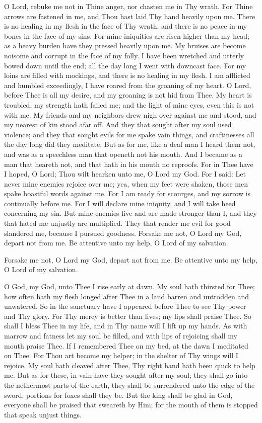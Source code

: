 \documentclass[
  14pt,
  letterpaper,
  openright,
  twocolumn,
  twoside]{memoir}
\begin{document}
O Lord, rebuke me not in Thine anger, nor chasten me in Thy wrath. For Thine arrows are fastened in me, and Thou hast laid Thy hand heavily upon me. There is no healing in my flesh in the face of Thy wrath; and there is no peace in my bones in the face of my sins. For mine iniquities are risen higher than my head; as a heavy burden have they pressed heavily upon me. My bruises are become noisome and corrupt in the face of my folly. I have been wretched and utterly bowed down until the end; all the day long I went with downcast face. For my loins are filled with mockings, and there is no healing in my flesh. I am afflicted and humbled exceedingly, I have roared from the groaning of my heart. O Lord, before Thee is all my desire, and my groaning is not hid from Thee. My heart is troubled, my strength hath failed me; and the light of mine eyes, even this is not with me. My friends and my neighbors drew nigh over against me and stood, and my nearest of kin stood afar off. And they that sought after my soul used violence; and they that sought evils for me spake vain things, and craftinesses all the day long did they meditate. But as for me, like a deaf man I heard them not, and was as a speechless man that openeth not his mouth. And I became as a man that heareth not, and that hath in his mouth no reproofs. For in Thee have I hoped, O Lord; Thou wilt hearken unto me, O Lord my God. For I said: Let never mine enemies rejoice over me; yea, when my feet were shaken, those men spake boastful words against me. For I am ready for scourges, and my sorrow is continually before me. For I will declare mine iniquity, and I will take heed concerning my sin. But mine enemies live and are made stronger than I, and they that hated me unjustly are multiplied. They that render me evil for good slandered me, because I pursued goodness. Forsake me not, O Lord my God, depart not from me. Be attentive unto my help, O Lord of my salvation.

Forsake me not, O Lord my God, depart not from me. Be attentive unto my help, O Lord of my salvation.


O God, my God, unto Thee I rise early at dawn. My soul hath thirsted for Thee; how often hath my flesh longed after Thee in a land barren and untrodden and unwatered. So in the sanctuary have I appeared before Thee to see Thy power and Thy glory. For Thy mercy is better than lives; my lips shall praise Thee. So shall I bless Thee in my life, and in Thy name will I lift up my hands. As with marrow and fatness let my soul be filled, and with lips of rejoicing shall my mouth praise Thee. If I remembered Thee on my bed, at the dawn I meditated on Thee. For Thou art become my helper; in the shelter of Thy wings will I rejoice. My soul hath cleaved after Thee, Thy right hand hath been quick to help me. But as for these, in vain have they sought after my soul; they shall go into the nethermost parts of the earth, they shall be surrendered unto the edge of the sword; portions for foxes shall they be. But the king shall be glad in God, everyone shall be praised that sweareth by Him; for the mouth of them is stopped that speak unjust things.
\end{document}
